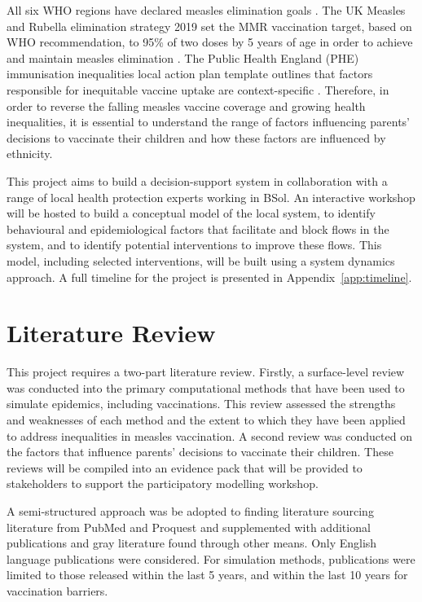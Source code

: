 \documentclass{article}
\begin{document}
All six WHO regions have declared measles elimination goals \cite{WHO_measles_topic}. The UK Measles and Rubella elimination strategy 2019 set the MMR vaccination target, based on WHO recommendation, to 95\% of two doses by 5 years of age in order to achieve and maintain measles elimination \cite{public2019uk}. The Public Health England (PHE) immunisation inequalities local action plan template outlines that factors responsible for inequitable vaccine uptake are context-specific \cite{PHE2021ImmunisationInequalities}. Therefore, in order to reverse the falling measles vaccine coverage and growing health inequalities, it is essential to understand the range of factors influencing parents’ decisions to vaccinate their children and how these factors are influenced by ethnicity.

This project aims to build a decision-support system in collaboration with a range of local health protection experts working in BSol. An interactive workshop will be hosted to build a conceptual model of the local system, to identify behavioural and epidemiological factors that facilitate and block flows in the system, and to identify potential interventions to improve these flows. This model, including selected interventions, will be built using a system dynamics approach. A full timeline for the project is presented in Appendix~\ref{app:timeline}.

\section{Literature Review}

This project requires a two-part literature review. Firstly, a surface-level review was conducted into the primary computational methods that have been used to simulate epidemics, including vaccinations. This review assessed the strengths and weaknesses of each method and the extent to which they have been applied to address inequalities in measles vaccination. A second review was conducted on the factors that influence parents' decisions to vaccinate their children. These reviews will be compiled into an evidence pack that will be provided to stakeholders to support the participatory modelling workshop.

A semi-structured approach was be adopted to finding literature sourcing literature from PubMed and Proquest and supplemented with additional publications and gray literature found through other means. Only English language publications were considered. For simulation methods, publications were limited to those released within the last 5 years, and within the last 10 years for vaccination barriers.
\end{document}
